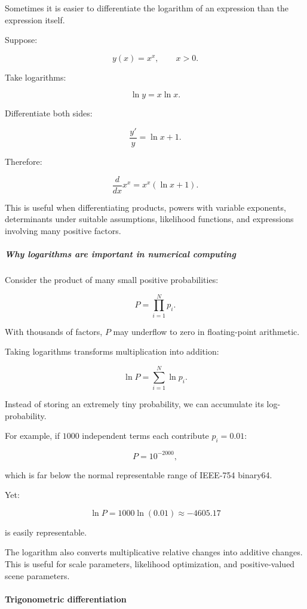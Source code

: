 Sometimes it is easier to differentiate the logarithm of an expression than the expression itself.

Suppose:

\[
y(x)=x^x,\qquad x>0.
\]

Take logarithms:

\[
\ln y=x\ln x.
\]

Differentiate both sides:

\[
\frac{y'}y=\ln x+1.
\]

Therefore:

\[
\boxed{\frac d{dx}x^x=x^x(\ln x+1)}.
\]

This is useful when differentiating products, powers with variable exponents, determinants under suitable assumptions, likelihood functions, and expressions involving many positive factors.

\subparagraph{Why logarithms are important in numerical computing}\label{01-foundations-i-ch020-why-logarithms-are-important-in-numerical-computing}

\hypertarget{01-foundations-i-ch020-why-logarithms-are-important-in-numerical-computing}{}

Consider the product of many small positive probabilities:

\[
P=\prod_{i=1}^{N}p_i.
\]

With thousands of factors, \(P\) may underflow to zero in floating-point arithmetic.

Taking logarithms transforms multiplication into addition:

\[
\ln P=\sum_{i=1}^{N}\ln p_i.
\]

Instead of storing an extremely tiny probability, we can accumulate its log-probability.

For example, if \(1000\) independent terms each contribute \(p_i=0.01\):

\[
P=10^{-2000},
\]

which is far below the normal representable range of IEEE-754 binary64.

Yet:

\[
\ln P=1000\ln(0.01)\approx-4605.17
\]

is easily representable.

The logarithm also converts multiplicative relative changes into additive changes. This is useful for scale parameters, likelihood optimization, and positive-valued scene parameters.

\paragraph{Trigonometric differentiation}\label{01-foundations-i-ch020-trigonometric-differentiation}

